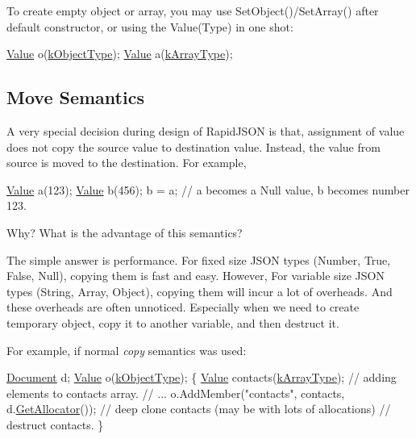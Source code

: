 To create empty object or array, you may use {\ttfamily Set\+Object()}/{\ttfamily Set\+Array()} after default constructor, or using the {\ttfamily Value(\+Type)} in one shot\+:


\begin{DoxyCode}
\hyperlink{class_generic_value}{Value} o(\hyperlink{rapidjson_8h_a1d1cfd8ffb84e947f82999c682b666a7a146f46700e905e8df96a6a90b5c7640f}{kObjectType});
\hyperlink{class_generic_value}{Value} a(\hyperlink{rapidjson_8h_a1d1cfd8ffb84e947f82999c682b666a7af41527d6925efa3c5c3dadb23dfef7c8}{kArrayType});
\end{DoxyCode}
\hypertarget{md_Commun_Externe_RapidJSON_doc_tutorial.zh-cn_MoveSemantics}{}\subsection{Move Semantics}\label{md_Commun_Externe_RapidJSON_doc_tutorial.zh-cn_MoveSemantics}
A very special decision during design of Rapid\+J\+S\+ON is that, assignment of value does not copy the source value to destination value. Instead, the value from source is moved to the destination. For example,


\begin{DoxyCode}
\hyperlink{class_generic_value}{Value} a(123);
\hyperlink{class_generic_value}{Value} b(456);
b = a;         \textcolor{comment}{// a becomes a Null value, b becomes number 123.}
\end{DoxyCode}




Why? What is the advantage of this semantics?

The simple answer is performance. For fixed size J\+S\+ON types (Number, True, False, Null), copying them is fast and easy. However, For variable size J\+S\+ON types (String, Array, Object), copying them will incur a lot of overheads. And these overheads are often unnoticed. Especially when we need to create temporary object, copy it to another variable, and then destruct it.

For example, if normal {\itshape copy} semantics was used\+:


\begin{DoxyCode}
\hyperlink{class_generic_document}{Document} d;
\hyperlink{class_generic_value}{Value} o(\hyperlink{rapidjson_8h_a1d1cfd8ffb84e947f82999c682b666a7a146f46700e905e8df96a6a90b5c7640f}{kObjectType});
\{
    \hyperlink{class_generic_value}{Value} contacts(\hyperlink{rapidjson_8h_a1d1cfd8ffb84e947f82999c682b666a7af41527d6925efa3c5c3dadb23dfef7c8}{kArrayType});
    \textcolor{comment}{// adding elements to contacts array.}
    \textcolor{comment}{// ...}
    o.AddMember(\textcolor{stringliteral}{"contacts"}, contacts, d.\hyperlink{class_generic_document_aa4609d6b19f86aec1a6b96edf2c27686}{GetAllocator}());  \textcolor{comment}{// deep clone contacts (may be with
       lots of allocations)}
    \textcolor{comment}{// destruct contacts.}
\}
\end{DoxyCode}




